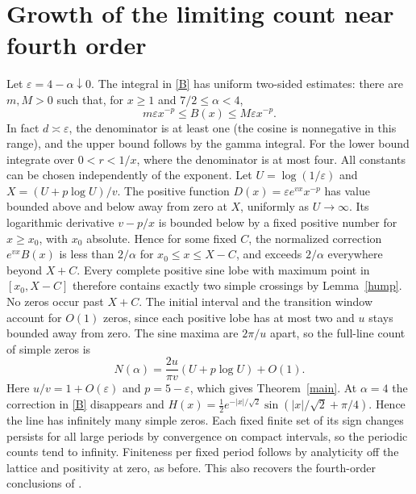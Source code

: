\documentclass[11pt]{article}
\theoremstyle{plain}\newtheorem{theorem}{Theorem}[section]\newtheorem{lemma}[theorem]{Lemma}\newtheorem{corollary}[theorem]{Corollary}\newtheorem{proposition}[theorem]{Proposition}
\numberwithin{equation}{section}
\begin{document}
\section{Growth of the limiting count near fourth order}
Let $\varepsilon=4-\alpha\downarrow0$. The integral in \eqref{B} has uniform two-sided estimates: there are $m,M>0$ such that, for $x\ge1$ and $7/2\le\alpha<4$,
\[
          m\varepsilon x^{-p}\le B(x)\le M\varepsilon x^{-p}.
\]
In fact $d\asymp\varepsilon$, the denominator is at least one (the cosine is nonnegative in this range), and the upper bound follows by the gamma integral. For the lower bound integrate over $0<r<1/x$, where the denominator is at most four. All constants can be chosen independently of the exponent.
Let $U=\log(1/\varepsilon)$ and $X=(U+p\log U)/v$. The positive function $D(x)=\varepsilon e^{vx}x^{-p}$ has value bounded above and below away from zero at $X$, uniformly as $U\to\infty$. Its logarithmic derivative $v-p/x$ is bounded below by a fixed positive number for $x\ge x_0$, with $x_0$ absolute. Hence for some fixed $C$, the normalized correction $e^{vx}B(x)$ is less than $2/\alpha$ for $x_0\le x\le X-C$, and exceeds $2/\alpha$ everywhere beyond $X+C$. Every complete positive sine lobe with maximum point in $[x_0,X-C]$ therefore contains exactly two simple crossings by Lemma~\ref{hump}. No zeros occur past $X+C$. The initial interval and the transition window account for $O(1)$ zeros, since each positive lobe has at most two and $u$ stays bounded away from zero. The sine maxima are $2\pi/u$ apart, so the full-line count of simple zeros is
\[
       N(\alpha)=\frac{2u}{\pi v}(U+p\log U)+O(1).
\]
Here $u/v=1+O(\varepsilon)$ and $p=5-\varepsilon$, which gives Theorem~\ref{main}. At $\alpha=4$ the correction in \eqref{B} disappears and $H(x)=\tfrac12e^{-|x|/\sqrt2}\sin(|x|/\sqrt2+\pi/4)$. Hence the line has infinitely many simple zeros. Each fixed finite set of its sign changes persists for all large periods by convergence on compact intervals, so the periodic counts tend to infinity. Finiteness per fixed period follows by analyticity off the lattice and positivity at zero, as before. This also recovers the fourth-order conclusions of \cite[Appendix B]{lp}.
\end{document}
